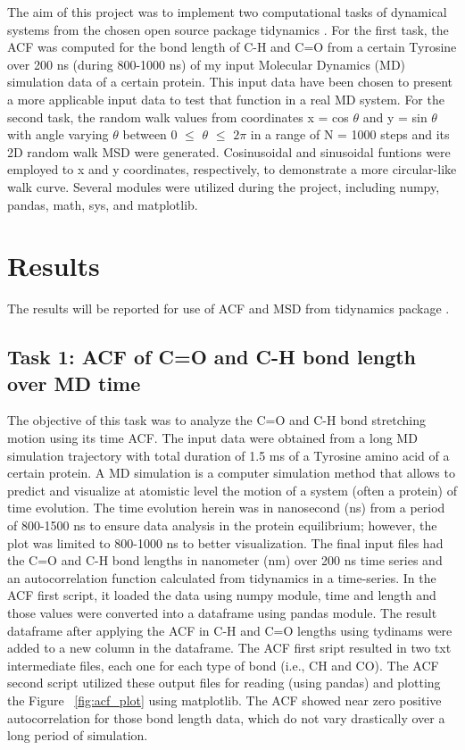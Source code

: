 \documentclass{article}
\begin{document}
The aim of this project was to implement two computational tasks of dynamical systems from the chosen open source package tidynamics \cite{Buyl2018}. For the first task, the ACF was computed for the bond length of C-H and C=O from a certain Tyrosine over 200 ns (during 800-1000 ns) of my input Molecular Dynamics (MD) simulation data of a certain protein. This input data have been chosen to present a more applicable input data to test that function in a real MD system. For the second task, the random walk values from coordinates x = cos $\theta$ and y = sin $\theta$ with angle varying $\theta$ between 0 $\leq$ $\theta$ $\leq$ $2\pi$ in a range of N = 1000 steps and its 2D random walk MSD were generated. Cosinusoidal and sinusoidal funtions were employed to x and y coordinates, respectively, to demonstrate a more circular-like walk curve. Several modules were utilized during the project, including numpy, pandas, math, sys, and matplotlib.

\section{Results}

The results will be reported for use of ACF and MSD from tidynamics package \cite{Buyl2018}.

\subsection{Task 1: ACF of C=O and C-H bond length over MD time}

The objective of this task was to analyze the C=O and C-H bond stretching motion using its time ACF. The input data were obtained from a long MD simulation trajectory with total duration of 1.5 ms of a Tyrosine amino acid of a certain protein. A MD simulation is a computer simulation method that allows to predict and visualize at atomistic level the motion of a system (often a protein) of time evolution. The time evolution herein was in nanosecond (ns) from a period of 800-1500 ns to ensure data analysis in the protein equilibrium; however, the plot was limited to 800-1000 ns to better visualization. The final input files had the C=O and C-H bond lengths in nanometer (nm) over 200 ns time series and an autocorrelation function calculated from tidynamics \cite{Buyl2018} in a time-series. In the ACF first script, it loaded the data using numpy module, time and length and those values were converted into a dataframe using pandas module. The result dataframe after applying the ACF in C-H and C=O lengths using tydinams were added to a new column in the dataframe. The ACF first sript resulted in two txt intermediate files, each one for each type of bond (i.e., CH and CO). The ACF second script utilized these output files for reading (using pandas) and plotting the Figure ~\ref{fig:acf_plot} using matplotlib. The ACF showed near zero positive autocorrelation for those bond length data, which do not vary drastically over a long period of simulation.
\end{document}
